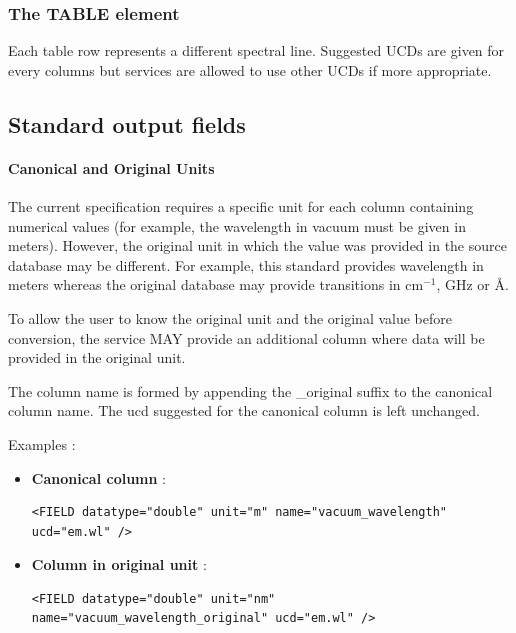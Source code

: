 \documentclass[11pt,a4paper]{ivoa}
\begin{document}
\subsubsection{The TABLE element}

Each table row represents a different spectral line.
Suggested UCDs are given for every columns but services are allowed to use other UCDs if more appropriate.

\subsection{Standard output fields}

\paragraph{Canonical and Original Units}

The current specification requires a specific unit for each column containing
numerical values (for example, the wavelength in vacuum must be given in meters).
However, the original unit in which the value was provided in the source database may be
different. For example, this standard provides wavelength in meters whereas the original
database may provide transitions in $\textrm{cm}^{-1}$, GHz or {\AA}.


To allow the user to know the original unit and the original value
before conversion, the service MAY provide an additional column where data
will be provided in the original unit.

The column name is formed by appending the \_original suffix to the
canonical column name. The ucd suggested for the canonical column is left
unchanged.

Examples :

\begin{itemize}
  \item \textbf{Canonical column} :
    \begin{lstlisting}[basicstyle=\small\ttfamily]
<FIELD datatype="double" unit="m" name="vacuum_wavelength" ucd="em.wl" />
    \end{lstlisting}
  \item \textbf{Column in original unit} :
    \begin{lstlisting}[basicstyle=\small\ttfamily]
<FIELD datatype="double" unit="nm" name="vacuum_wavelength_original" ucd="em.wl" />
    \end{lstlisting}
\end{itemize}
\end{document}

